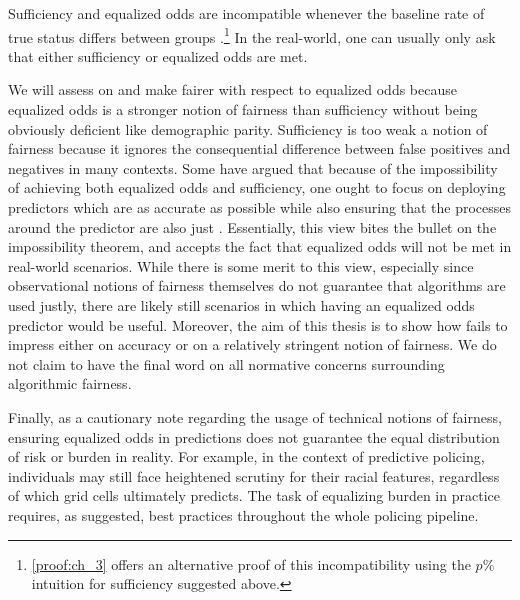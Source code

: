 Sufficiency and equalized odds are incompatible whenever the baseline rate of true status differs between groups \citep{kleinberg_inherent_2016,chouldechova_fair_2017}.\footnote{\autoref{proof:ch_3} offers an alternative proof of this incompatibility using the $p\%$ intuition for sufficiency suggested above.} In the real-world, one can usually only ask that either sufficiency or equalized odds are met.

We will assess \pp on and make \pp fairer with respect to equalized odds because equalized odds is a stronger notion of fairness than sufficiency without being obviously deficient like demographic parity. Sufficiency is too weak a notion of fairness because it ignores the consequential difference between false positives and negatives in many contexts. Some have argued that because of the impossibility of achieving both equalized odds and sufficiency, one ought to focus on deploying predictors which are as accurate as possible while also ensuring that the processes around the predictor are also just \citep{corbett-davies_algorithmic_2017}. Essentially, this view bites the bullet on the impossibility theorem, and accepts the fact that equalized odds will not be met in real-world scenarios. While there is some merit to this view, especially since observational notions of fairness themselves do not guarantee that algorithms are used justly, there are likely still scenarios in which having an equalized odds predictor would be useful. Moreover, the aim of this thesis is to show how \pp fails to impress either on accuracy or on a relatively stringent notion of fairness. We do not claim to have the final word on all normative concerns surrounding algorithmic fairness.

Finally, as a cautionary note regarding the usage of technical notions of fairness, ensuring equalized odds in predictions does not guarantee the equal distribution of risk or burden in reality. For example, in the context of predictive policing, individuals may still face heightened scrutiny for their racial features, regardless of which grid cells \pp ultimately predicts. The task of equalizing burden in practice requires, as \citet{perry_predictive_2013} suggested, best practices throughout the whole policing pipeline.
